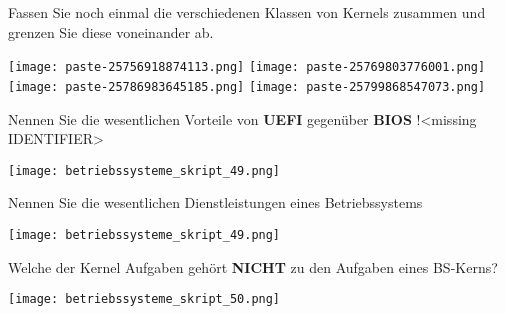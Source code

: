 \documentclass{article}
\begin{document}
\begin{tcolorbox}[colback=white!10!white,colframe=lightgray!75!black,
  savelowerto=\jobname_ex.tex,breakable,enhanced,lines before break=40]

\begin{center}
Fassen Sie noch einmal die verschiedenen Klassen von Kernels zusammen und grenzen Sie diese voneinander ab.

\end{center}

\tcblower

\justifying
\texttt{[image: paste-25756918874113.png]}
\texttt{[image: paste-25769803776001.png]}
\texttt{[image: paste-25786983645185.png]}
\texttt{[image: paste-25799868547073.png]}

\end{tcolorbox}
\begin{tcolorbox}[colback=white!10!white,colframe=lightgray!75!black,
  savelowerto=\jobname_ex.tex,breakable,enhanced,lines before break=40]

\begin{center}
Nennen Sie die wesentlichen Vorteile von 
\textbf{UEFI
} gegenüber 
\textbf{BIOS
}!<missing IDENTIFIER>

\end{center}

\tcblower

\justifying
\texttt{[image: betriebssysteme\_skript\_49.png]}

\end{tcolorbox}
\begin{tcolorbox}[colback=white!10!white,colframe=lightgray!75!black,
  savelowerto=\jobname_ex.tex,breakable,enhanced,lines before break=40]

\begin{center}
Nennen Sie die wesentlichen Dienstleistungen eines Betriebssystems

\end{center}

\tcblower

\justifying
\texttt{[image: betriebssysteme\_skript\_49.png]}

\end{tcolorbox}
\begin{tcolorbox}[colback=white!10!white,colframe=lightgray!75!black,
  savelowerto=\jobname_ex.tex,breakable,enhanced,lines before break=40]

\begin{center}
Welche der Kernel Aufgaben gehört 
\textbf{NICHT
} zu den Aufgaben eines BS-Kerns?

\end{center}

\tcblower

\justifying
\texttt{[image: betriebssysteme\_skript\_50.png]}

\end{tcolorbox}
\end{document}
